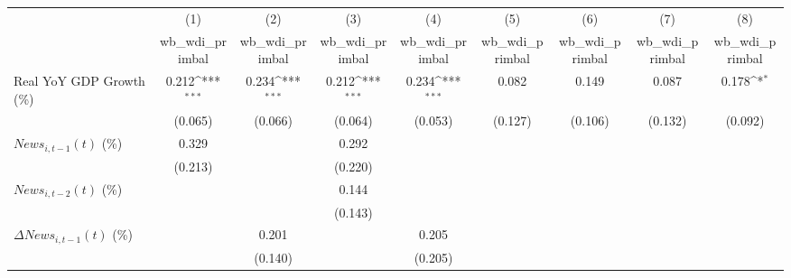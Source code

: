 {
\def\sym#1{\ifmmode^{#1}\else\(^{#1}\)\fi}
\begin{tabular}{l*{8}{c}}
\toprule
                    &\multicolumn{1}{c}{(1)}&\multicolumn{1}{c}{(2)}&\multicolumn{1}{c}{(3)}&\multicolumn{1}{c}{(4)}&\multicolumn{1}{c}{(5)}&\multicolumn{1}{c}{(6)}&\multicolumn{1}{c}{(7)}&\multicolumn{1}{c}{(8)}\\
                    &\multicolumn{1}{c}{wb_wdi_primbal}&\multicolumn{1}{c}{wb_wdi_primbal}&\multicolumn{1}{c}{wb_wdi_primbal}&\multicolumn{1}{c}{wb_wdi_primbal}&\multicolumn{1}{c}{wb_wdi_primbal}&\multicolumn{1}{c}{wb_wdi_primbal}&\multicolumn{1}{c}{wb_wdi_primbal}&\multicolumn{1}{c}{wb_wdi_primbal}\\
\midrule
Real YoY GDP Growth (\%)&       0.212\sym{***}&       0.234\sym{***}&       0.212\sym{***}&       0.234\sym{***}&       0.082         &       0.149         &       0.087         &       0.178\sym{*}  \\
                    &     (0.065)         &     (0.066)         &     (0.064)         &     (0.053)         &     (0.127)         &     (0.106)         &     (0.132)         &     (0.092)         \\
\addlinespace
$ News_{i,t-1}(t)$ (\%)&       0.329         &                     &       0.292         &                     &                     &                     &                     &                     \\
                    &     (0.213)         &                     &     (0.220)         &                     &                     &                     &                     &                     \\
\addlinespace
$ News_{i,t-2}(t)$ (\%)&                     &                     &       0.144         &                     &                     &                     &                     &                     \\
                    &                     &                     &     (0.143)         &                     &                     &                     &                     &                     \\
\addlinespace
$ \Delta News_{i,t-1}(t)$ (\%)&                     &       0.201         &                     &       0.205         &                     &                     &                     &                     \\
                    &                     &     (0.140)         &                     &     (0.205)         &                     &                     &                     &                     \\

\end{tabular}}
